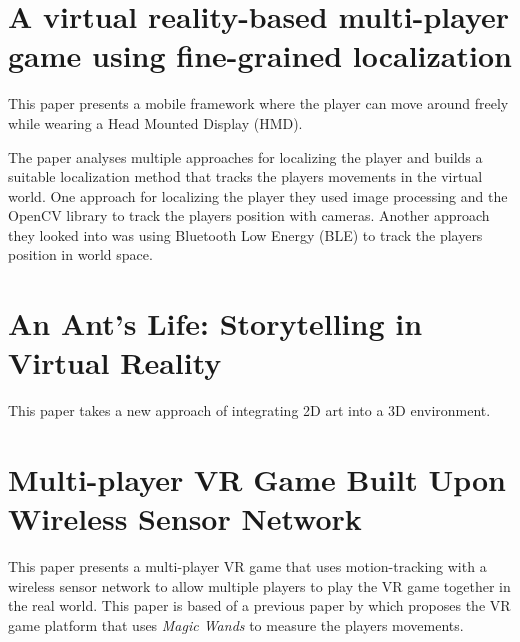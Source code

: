 \documentclass{scrartcl}
\begin{document}
\section{A virtual reality-based multi-player game using fine-grained localization \cite{de2015virtual}}
This paper presents a mobile framework where the player can move around freely while wearing a Head Mounted Display (HMD). 

The paper analyses multiple approaches for localizing the player and builds a suitable localization method that tracks the players movements in the virtual world. 
One approach for localizing the player they used image processing and the OpenCV library to track the players position with cameras. Another approach they looked into was using Bluetooth Low Energy (BLE) to track the players position in world space. 

\section{An Ant's Life: Storytelling in Virtual Reality \cite{Leo:2015}}
This paper takes a new approach of integrating 2D art into a 3D environment.

\section{ Multi-player VR Game Built Upon Wireless Sensor Network \cite{Jee:2008}}
This paper presents a multi-player VR game that uses motion-tracking with a wireless sensor network to allow multiple players to play the VR game together in the real world.
This paper is based of a previous paper by \cite{Eom:2006} which proposes the VR game platform that uses \textit{Magic Wands} to measure the players movements.



\end{document}
